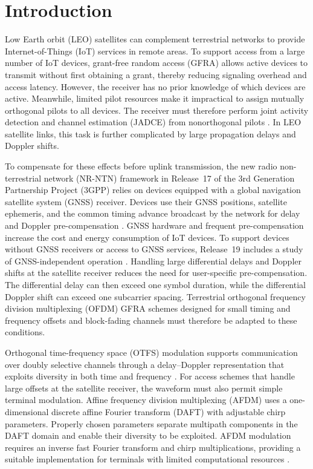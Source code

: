 \section{Introduction}
\label{sec:introduction}

Low Earth orbit (LEO) satellites can complement terrestrial networks
to provide Internet-of-Things (IoT) services in remote areas.
To support access from a large number of IoT devices, grant-free random
access (GFRA) allows active devices to transmit without first obtaining
a grant, thereby reducing signaling overhead and access latency.
However, the receiver has no prior knowledge of which devices are
active. Meanwhile, limited pilot resources make it impractical to assign
mutually orthogonal pilots to all devices. The receiver must therefore
perform joint activity detection and channel estimation (JADCE) from
nonorthogonal pilots \cite{liu2018}. In LEO satellite links, this task
is further complicated by large propagation delays and Doppler shifts.

To compensate for these effects before uplink transmission, the new
radio non-terrestrial network (NR-NTN) framework in Release~17 of the
3rd Generation Partnership Project (3GPP) relies on devices equipped
with a global navigation satellite system (GNSS) receiver. Devices use
their GNSS positions, satellite ephemeris, and the common timing advance
broadcast by the network for delay and Doppler pre-compensation
\cite{3gpp38300}. GNSS hardware and frequent pre-compensation increase
the cost and energy consumption of IoT devices. To support devices
without GNSS receivers or access to GNSS services, Release~19 includes
a study of GNSS-independent operation \cite{3gpp22865}. Handling large
differential delays and Doppler shifts at the satellite receiver reduces
the need for user-specific pre-compensation. The differential delay can
then exceed one symbol duration, while the differential Doppler shift
can exceed one subcarrier spacing. Terrestrial orthogonal frequency
division multiplexing (OFDM) GFRA schemes designed for small timing and
frequency offsets and block-fading channels must therefore be adapted
to these conditions.

Orthogonal time-frequency space (OTFS) modulation supports communication
over doubly selective channels through a delay--Doppler representation
that exploits diversity in both time and frequency \cite{hadani2017}.
For access schemes that handle large offsets at the satellite receiver,
the waveform must also permit simple terminal modulation. Affine
frequency division multiplexing (AFDM) uses a one-dimensional discrete
affine Fourier transform (DAFT) with adjustable chirp parameters.
Properly chosen parameters separate multipath components in the DAFT
domain and enable their diversity to be exploited. AFDM modulation
requires an inverse fast Fourier transform and chirp multiplications,
providing a suitable implementation for terminals with limited
computational resources \cite{bemani2022}.

